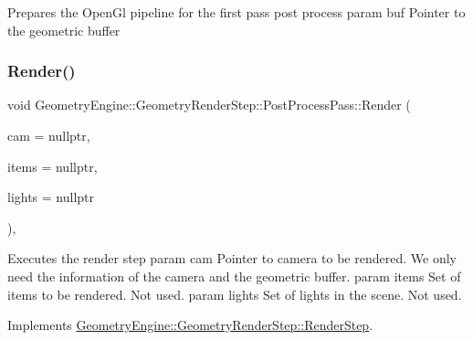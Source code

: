 Prepares the Open\+Gl pipeline for the first pass post process param buf Pointer to the geometric buffer \mbox{\label{class_geometry_engine_1_1_geometry_render_step_1_1_post_process_pass_a2ebe2a0b940e47ccd10e649bff77138d}} 
\subsubsection{\texorpdfstring{Render()}{Render()}}
{\footnotesize\ttfamily void Geometry\+Engine\+::\+Geometry\+Render\+Step\+::\+Post\+Process\+Pass\+::\+Render (\begin{DoxyParamCaption}\item[{\mbox{\hyperlink{class_geometry_engine_1_1_geometry_world_item_1_1_geometry_camera_1_1_camera}{Geometry\+World\+Item\+::\+Geometry\+Camera\+::\+Camera}} $\ast$}]{cam = {\ttfamily nullptr},  }\item[{std\+::unordered\+\_\+set$<$ \mbox{\hyperlink{class_geometry_engine_1_1_geometry_world_item_1_1_geometry_item_1_1_geometry_item}{Geometry\+World\+Item\+::\+Geometry\+Item\+::\+Geometry\+Item}} $\ast$ $>$ $\ast$}]{items = {\ttfamily nullptr},  }\item[{std\+::unordered\+\_\+set$<$ \mbox{\hyperlink{class_geometry_engine_1_1_geometry_world_item_1_1_geometry_light_1_1_light}{Geometry\+World\+Item\+::\+Geometry\+Light\+::\+Light}} $\ast$ $>$ $\ast$}]{lights = {\ttfamily nullptr} }\end{DoxyParamCaption})\hspace{0.3cm}{\ttfamily [override]}, {\ttfamily [virtual]}}

Executes the render step param cam Pointer to camera to be rendered. We only need the information of the camera and the geometric buffer. param items Set of items to be rendered. Not used. param lights Set of lights in the scene. Not used. 

Implements \mbox{\hyperlink{class_geometry_engine_1_1_geometry_render_step_1_1_render_step_a9b054ee8f38304319a9d03ba3e173dcd}{Geometry\+Engine\+::\+Geometry\+Render\+Step\+::\+Render\+Step}}.

\mbox{\label{class_geometry_engine_1_1_geometry_render_step_1_1_post_process_pass_a3d555943a9bc2b3105e71b8984b1ce0b}} 
